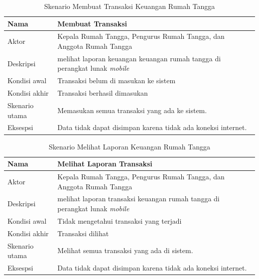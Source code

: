 \begin{table}[H]
	\centering
		\begin{tabular}{ |p{2cm}|p{10cm}| }
			\hline
			Nama &  Membuat Transaksi\\ \hline
			Aktor & Kepala Rumah Tangga, Pengurus Rumah Tangga, dan Anggota Rumah Tangga \\ \hline
			Deskripsi & melihat laporan keuangan keuangan rumah tangga di perangkat lunak \textit{mobile} \\ \hline
			Kondisi awal & Transaksi belum di masukan ke sistem  \\ \hline
			Kondisi akhir & Transaksi berhasil dimasukan \\ \hline
			Skenario utama & Memasukan semua transaksi yang ada ke sistem. \\ \hline
			Eksespsi & Data tidak dapat disimpan karena tidak ada koneksi internet.  \\ 
			\hline
		\end{tabular}
	\caption{Skenario Membuat Transaksi Keuangan Rumah Tangga}
	\label{tab:membuat transaksi}
\end{table}

\begin{table}[H]
	\centering
		\begin{tabular}{ |p{2cm}|p{10cm}| }
			\hline
			Nama &  Melihat Laporan Transaksi\\ \hline
			Aktor & Kepala Rumah Tangga, Pengurus Rumah Tangga, dan Anggota Rumah Tangga \\ \hline
			Deskripsi & melihat laporan transaksi keuangan rumah tangga di perangkat lunak \textit{mobile} \\ \hline
			Kondisi awal & Tidak mengetahui transaksi yang terjadi  \\ \hline
			Kondisi akhir & Transaksi dilihat \\ \hline
			Skenario utama & Melihat semua transaksi yang ada di sistem. \\ \hline
			Eksespsi & Data tidak dapat disimpan karena tidak ada koneksi internet.  \\ 
			\hline
		\end{tabular}
	\caption{Skenario Melihat Laporan Keuangan Rumah Tangga}
	\label{tab:melihatLaporan}
\end{table}

